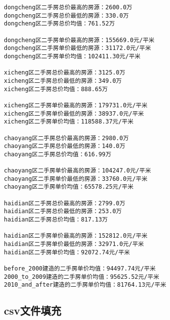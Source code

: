 \documentclass[lang=cn,11pt,a4paper]{elegantpaper}
\begin{document}
\begin{lstlisting}[language=text]
dongcheng区二手房总价最高的房源：2600.0万
dongcheng区二手房总价最低的房源：330.0万
dongcheng区二手房总价均值：761.52万

dongcheng区二手房单价最高的房源：155669.0元/平米
dongcheng区二手房单价最低的房源：31172.0元/平米
dongcheng区二手房单价均值：102411.30元/平米

xicheng区二手房总价最高的房源：3125.0万
xicheng区二手房总价最低的房源：349.0万
xicheng区二手房总价均值：888.65万

xicheng区二手房单价最高的房源：179731.0元/平米
xicheng区二手房单价最低的房源：38937.0元/平米
xicheng区二手房单价均值：118588.37元/平米

chaoyang区二手房总价最高的房源：2980.0万
chaoyang区二手房总价最低的房源：140.0万
chaoyang区二手房总价均值：616.99万

chaoyang区二手房单价最高的房源：104247.0元/平米
chaoyang区二手房单价最低的房源：33760.0元/平米
chaoyang区二手房单价均值：65578.25元/平米

haidian区二手房总价最高的房源：2799.0万
haidian区二手房总价最低的房源：253.0万
haidian区二手房总价均值：817.13万

haidian区二手房单价最高的房源：152812.0元/平米
haidian区二手房单价最低的房源：32971.0元/平米
haidian区二手房单价均值：92072.74元/平米

before_2000建造的二手房单价均值：94497.74元/平米
2000_to_2009建造的二手房单价均值：95625.52元/平米
2010_and_after建造的二手房单价均值：81764.13元/平米
\end{lstlisting}

\subsection{csv文件填充}
\end{document}
